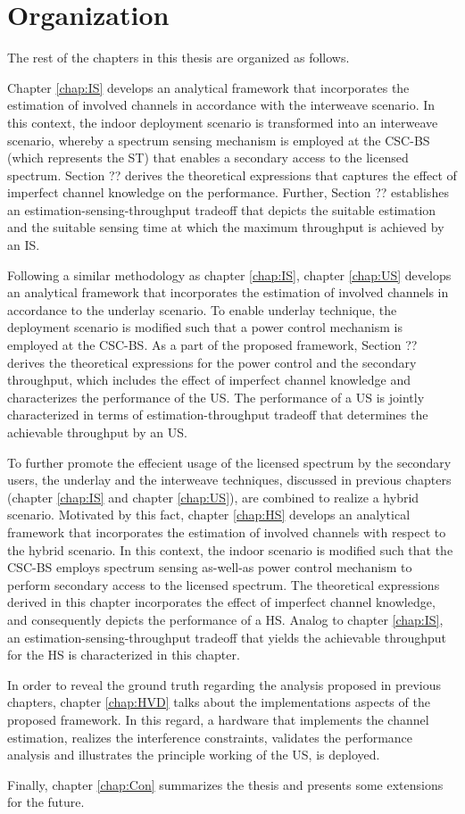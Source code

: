\section{Organization} 

The rest of the chapters in this thesis are organized as follows.

Chapter \ref{chap:IS} develops an analytical framework that incorporates the estimation of involved channels in accordance with the interweave scenario. In this context, the indoor deployment scenario is transformed into an interweave scenario, whereby a spectrum sensing mechanism is employed at the CSC-BS (which represents the ST) that enables a secondary access to the licensed spectrum. Section ?? derives the theoretical expressions that captures the effect of imperfect channel knowledge on the performance. Further, Section ?? establishes an estimation-sensing-throughput tradeoff that depicts the suitable estimation and the suitable sensing time at which the maximum throughput is achieved by an IS. 


Following a similar methodology as chapter \ref{chap:IS}, chapter \ref{chap:US} develops an analytical framework that incorporates the estimation of involved channels in accordance to the underlay scenario. To enable underlay technique, the deployment scenario is modified such that a power control mechanism is employed at the CSC-BS. As a part of the proposed framework, Section ?? derives the theoretical expressions for the power control and the secondary throughput, which includes the effect of imperfect channel knowledge and characterizes the performance of the US. The performance of a US is jointly characterized in terms of estimation-throughput tradeoff that determines the achievable throughput by an US. 


To further promote the effecient usage of the licensed spectrum by the secondary users, the underlay and the interweave techniques, discussed in previous chapters (chapter \ref{chap:IS} and chapter \ref{chap:US}), are combined to realize a hybrid scenario. Motivated by this fact, chapter \ref{chap:HS} develops an analytical framework that incorporates the estimation of involved channels with respect to the hybrid scenario. In this context, the indoor scenario is modified such that the CSC-BS employs spectrum sensing as-well-as power control mechanism to perform secondary access to the licensed spectrum. The theoretical expressions derived in this chapter incorporates the effect of imperfect channel knowledge, and consequently depicts the performance of a HS. Analog to chapter \ref{chap:IS}, an estimation-sensing-throughput tradeoff that yields the achievable throughput for the HS is characterized in this chapter. 

 
In order to reveal the ground truth regarding the analysis proposed in previous chapters, chapter \ref{chap:HVD} talks about the implementations aspects of the proposed framework. In this regard, a hardware that implements the channel estimation, realizes the interference constraints, validates the performance analysis and illustrates the principle working of the US, is deployed.   

Finally, chapter \ref{chap:Con} summarizes the thesis and presents some extensions for the future. 
